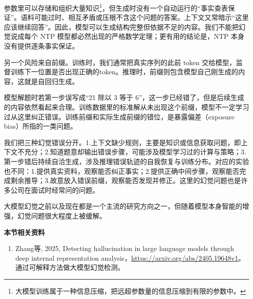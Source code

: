 参数里可以存储和组织大量知识\footnote{大模型训练属于一种信息压缩，把远超参数量的信息压缩到有限的参数中。}，但生成时没有一个自动运行的``事实查表保证''。语料可能过时、相互矛盾或压根不含这个问题的答案。上下文又常暗示``这里应该继续回答''。因此，模型可以生成结构完整但依据不足的内容。我们不能把幻觉说成每个 NTP 模型都必然出现的严格数学定理；更有用的结论是，NTP 本身没有提供逐条事实保证。

另一个风险来自前缀。训练时，我们通常把真实序列的此前 token 交给模型，监督训练下一位置是否出现正确的token。推理时，前缀则包含模型自己刚生成的内容，这就是自回归生成。

模型解题时若第一步误写成``21 除以 3 等于 6''，这一步已经错了，但是后续生成的内容依然看起来合理。训练数据里的标准解从未出现这个前缀，模型不一定学习过从这里纠正错误。训练前缀和实际生成前缀的错位，是暴露偏差（exposure bias）所指的一类问题。

我们把三种幻觉错误分开。1.上下文缺少规则，主要是知识或信息获取问题，即上下文不充分；2.知道题意却输出错误步骤，可能涉及模型学习过的计算与策略；3.第一步错后持续自洽生成，涉及推理错误轨迹的自我恢复与训练分布。对应的实验也不同：1.提供真实资料，观察能否纠正事实；2.提供正确中间步骤，观察能否完成剩余推导；3.故意放入错误前缀，观察能否发现并修正。这里的幻觉问题也是许多公司在面试时经常问的问题。

大模型幻觉之前以及现在都是一个主流的研究方向之一，但随着模型本身智能的增强，幻觉问题很大程度上被缓解。

\textbf{本节相关资料}
\begin{enumerate}
    \item Zhang等, 2025, Detecting hallucination in large language models through deep internal representation analysis，\href{https://arxiv.org/abs/2405.19648v1}{https://arxiv.org/abs/2405.19648v1}。通过可解释方法做大模型幻觉检测。
\end{enumerate}
